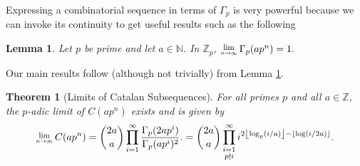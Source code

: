 \documentclass[a0]{a0poster}
\newtheorem{theorem}{Theorem}
\newtheorem{lemma}{Lemma}
\theoremstyle{definition}
\newcommand{\Lim}[1]{\raisebox{0.5ex}{\scalebox{0.8}{$\displaystyle \lim_{#1}\;$}}}
\newcommand{\thref}[1]{Theorem \ref{#1}}
\newcommand{\lemref}[1]{Lemma \ref{#1}}
\newcommand{\thlabel}[1]{\label{#1}}
\providecommand{\floor}[1]{\left \lfloor #1 \right \rfloor }
\begin{document}
\begin{textblock}{7}
Expressing a combinatorial sequence in terms of $\Gamma_p$ is very powerful because we can invoke its continuity to get useful results such as the following
\begin{lemma}\thlabel{p gamma}
Let $p$ be prime and let $a\in\mathbb{N}$. In $\mathbb{Z}_p$,
$\Lim{n\rightarrow \infty}\Gamma_p(ap^n)=1.$
\end{lemma} 

\noindent Our main results follow (although not trivially) from \lemref{p gamma}.

\begin{theorem}[Limits of Catalan Subsequences]\thlabel{limit thm}
For all primes $p$ and all $a\in\mathbb{Z}$, the $p$-adic limit of $C(ap^n)$ exists and is given by $$\Lim{n\rightarrow \infty} C(ap^n)=
\binom{2a}{a}\prod_{i=1}^{\infty}\frac{\Gamma_p(2ap^i)}{\Gamma_p(ap^i)^2}.=\binom{2a}{a}\prod_{\substack{i=1\\p\nmid i}}^{\infty}i^{2\floor{\log_p(i/a)}-\lfloor{\log(i/2a)}\rfloor}.$$
\end{theorem}





\end{textblock}
\end{document}
